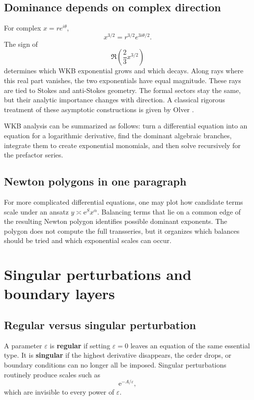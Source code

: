 \documentclass[11pt,openany]{book}
\theoremstyle{plain}
\theoremstyle{definition}
\theoremstyle{remark}
\newcommand{\e}{\mathrm{e}}
\newcommand{\defterm}[1]{\textbf{#1}}
\begin{document}
\section{Dominance depends on complex direction}
For complex $x=re^{i\theta}$,
\[
  x^{3/2}=r^{3/2}e^{3i\theta/2}.
\]
The sign of
\[
  \Re\left(\frac23x^{3/2}\right)
\]
determines which WKB exponential grows and which decays. Along rays where this real part vanishes, the two exponentials have equal magnitude. These rays are tied to Stokes and anti-Stokes geometry. The formal sectors stay the same, but their analytic importance changes with direction. A classical rigorous treatment of these asymptotic constructions is given by Olver \cite{Olver1997}.

\begin{ideabox}
WKB analysis can be summarized as follows: turn a differential equation into an equation for a logarithmic derivative, find the dominant algebraic branches, integrate them to create exponential monomials, and then solve recursively for the prefactor series.
\end{ideabox}

\section{Newton polygons in one paragraph}
For more complicated differential equations, one may plot how candidate terms scale under an ansatz $y\asymp\e^{S}x^\alpha$. Balancing terms that lie on a common edge of the resulting Newton polygon identifies possible dominant exponents. The polygon does not compute the full transseries, but it organizes which balances should be tried and which exponential scales can occur.

\chapter{Singular perturbations and boundary layers}
\label{chap:singular}

\section{Regular versus singular perturbation}
A parameter $\varepsilon$ is \defterm{regular} if setting $\varepsilon=0$ leaves an equation of the same essential type. It is \defterm{singular} if the highest derivative disappears, the order drops, or boundary conditions can no longer all be imposed. Singular perturbations routinely produce scales such as
\[
  \e^{-A/\varepsilon},
\]
which are invisible to every power of $\varepsilon$.
\end{document}
